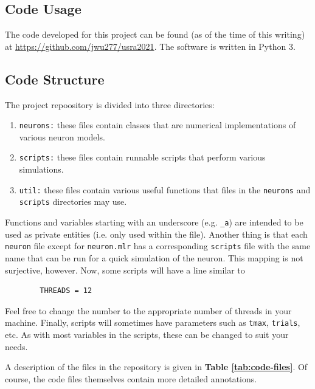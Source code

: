 \documentclass[letterpaper,12pt]{article}
\numberwithin{table}{section}
\numberwithin{figure}{section}
\numberwithin{equation}{section}
\newcommand{\reftab}[1]{\textbf{Table \ref{#1}}}
\begin{document}
\begin{flushleft}
    \pagebreak

    \section{Code Usage}

    The code developed for this project can be found (as of the time of this writing) at \url{https://github.com/jwu277/usra2021}. The software is written in Python 3.

    \subsection{Code Structure}

    The project repoository is divided into three directories:
    \begin{enumerate}
        \item \texttt{neurons:} these files contain classes that are numerical implementations of various neuron models.
        \item \texttt{scripts:} these files contain runnable scripts that perform various simulations.
        \item \texttt{util:} these files contain various useful functions that files in the \texttt{neurons} and \texttt{scripts} directories may use.
    \end{enumerate}

    Functions and variables starting with an underscore (e.g. \texttt{\_a}) are intended to be used as private entities (i.e. only used within the file). Another thing is that each \texttt{neuron} file except for \texttt{neuron.mlr} has a corresponding \texttt{scripts} file with the same name that can be run for a quick simulation of the neuron. This mapping is not surjective, however. Now, some scripts will have a line similar to
    \begin{lstlisting}
        THREADS = 12
    \end{lstlisting}
    Feel free to change the number to the appropriate number of threads in your machine. Finally, scripts will sometimes have parameters such as \texttt{tmax}, \texttt{trials}, etc. As with most variables in the scripts, these can be changed to suit your needs.

    A description of the files in the repository is given in \reftab{tab:code-files}. Of course, the code files themselves contain more detailed annotations.
    

\end{flushleft}
\end{document}
